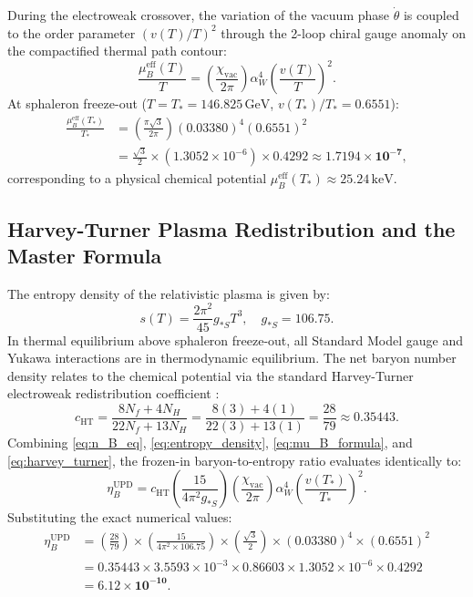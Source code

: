 \documentclass[11pt,a4paper]{article}
\begin{document}
During the electroweak crossover, the variation of the vacuum phase $\dot{\theta}$ is coupled to the order parameter $(v(T)/T)^2$ through the 2-loop chiral gauge anomaly on the compactified thermal path contour:
\begin{equation}
\frac{\mu_B^{\mathrm{eff}}(T)}{T} = \left( \frac{\chi_{\mathrm{vac}}}{2\pi} \right) \alpha_W^4 \left( \frac{v(T)}{T} \right)^2.
\label{eq:mu_B_formula}
\end{equation}
At sphaleron freeze-out ($T = T_* = 146.825\,\mathrm{GeV}$, $v(T_*)/T_* = 0.6551$):
\begin{align}
\frac{\mu_B^{\mathrm{eff}}(T_*)}{T_*} &= \left( \frac{\pi\sqrt{3}}{2\pi} \right) (0.03380)^4 (0.6551)^2 \nonumber \\
&= \frac{\sqrt{3}}{2} \times (1.3052 \times 10^{-6}) \times 0.4292 \approx \mathbf{1.7194 \times 10^{-7}},
\end{align}
corresponding to a physical chemical potential $\mu_B^{\mathrm{eff}}(T_*) \approx 25.24\,\mathrm{keV}$.

\subsection{Harvey-Turner Plasma Redistribution and the Master Formula}
The entropy density of the relativistic plasma is given by:
\begin{equation}
s(T) = \frac{2\pi^2}{45} g_{*S} T^3, \quad g_{*S} = 106.75.
\label{eq:entropy_density}
\end{equation}
In thermal equilibrium above sphaleron freeze-out, all Standard Model gauge and Yukawa interactions are in thermodynamic equilibrium. The net baryon number density relates to the chemical potential via the standard Harvey-Turner electroweak redistribution coefficient \cite{Harvey1990}:
\begin{equation}
c_{\mathrm{HT}} = \frac{8 N_f + 4 N_H}{22 N_f + 13 N_H} = \frac{8(3) + 4(1)}{22(3) + 13(1)} = \frac{28}{79} \approx 0.35443.
\label{eq:harvey_turner}
\end{equation}
Combining \eqref{eq:n_B_eq}, \eqref{eq:entropy_density}, \eqref{eq:mu_B_formula}, and \eqref{eq:harvey_turner}, the frozen-in baryon-to-entropy ratio evaluates identically to:
\begin{equation}
\eta_B^{\mathrm{UPD}} = c_{\mathrm{HT}} \left( \frac{15}{4\pi^2 g_{*S}} \right) \left( \frac{\chi_{\mathrm{vac}}}{2\pi} \right) \alpha_W^4 \left( \frac{v(T_*)}{T_*} \right)^2.
\label{eq:master_eta_B}
\end{equation}
Substituting the exact numerical values:
\begin{align}
\eta_B^{\mathrm{UPD}} &= \left( \frac{28}{79} \right) \times \left( \frac{15}{4\pi^2 \times 106.75} \right) \times \left( \frac{\sqrt{3}}{2} \right) \times (0.03380)^4 \times (0.6551)^2 \nonumber \\
&= 0.35443 \times 3.5593 \times 10^{-3} \times 0.86603 \times 1.3052 \times 10^{-6} \times 0.4292 \nonumber \\
&= \mathbf{6.12 \times 10^{-10}}.
\label{eq:eta_B_result}
\end{align}
\end{document}
